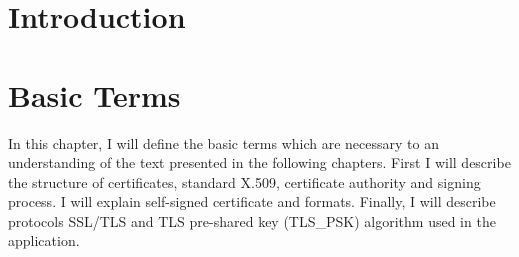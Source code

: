 \documentclass[
  digital, %
  notable,   %
  lof,     %
  lot,     %
]{fithesis3}
\begin{document}
\chapter{Introduction}


\chapter{Basic Terms}
In this chapter, I will define the basic terms which are necessary to an understanding of the 
text presented in the following chapters. First I will describe the structure of certificates, 
standard X.509, certificate authority and signing process. I will explain self-signed certificate and formats. Finally, I will describe protocols SSL/TLS and TLS pre-shared key (TLS\_PSK) 
algorithm used in the application.

\end{document}
